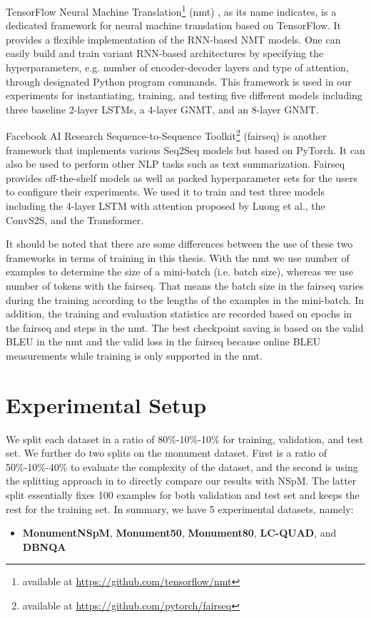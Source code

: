 TensorFlow Neural Machine Translation\footnote{available at \url{https://github.com/tensorflow/nmt}} (nmt) \cite{luong17}, as its name indicates, is a dedicated framework for neural machine translation based on TensorFlow. It provides a flexible implementation of the RNN-based NMT models. One can easily build and train variant RNN-based architectures by specifying the hyperparameters, e.g. number of encoder-decoder layers and type of attention, through designated Python program commands. This framework is used in our experiments for instantiating, training, and testing five different models including three baseline 2-layer LSTMs, a 4-layer GNMT, and an 8-layer GNMT.

Facebook AI Research Sequence-to-Sequence Toolkit\footnote{available at \url{https://github.com/pytorch/fairseq}} (fairseq) \cite{gehring2017convs2s} is another framework that implements various Seq2Seq models but based on PyTorch. It can also be used to perform other NLP tasks such as text summarization. Fairseq provides off-the-shelf models as well as packed hyperparameter sets for the users to configure their experiments. We used it to train and test three models including the 4-layer LSTM with attention proposed by Luong et al.\cite{Luong2015}, the ConvS2S, and the Transformer.

It should be noted that there are some differences between the use of these two frameworks in terms of training in this thesis. With the nmt we use number of examples to determine the size of a mini-batch (i.e. batch size), whereas we use number of tokens with the fairseq. That means the batch size in the fairseq varies during the training according to the lengths of the examples in the mini-batch. In addition, the training and evaluation statistics are recorded based on epochs in the fairseq and steps in the nmt. The best checkpoint saving is based on the valid BLEU in the nmt and the valid loss in the fairseq because online BLEU measurements while training is only supported in the nmt. 

\section{Experimental Setup} \label{section:experimental setup}

We split each dataset in a ratio of 80\%-10\%-10\% for training, validation, and test set. We further do two splits on the monument dataset. First is a ratio of 50\%-10\%-40\% to evaluate the complexity of the dataset, and the second is using the splitting approach in \cite{Soru2018a} to directly compare our results with NSpM. The latter split essentially fixes 100 examples for both validation and test set and keeps the rest for the training set. In summary, we have 5 experimental datasets, namely:
\begin{itemize}
\item \textbf{MonumentNSpM}, \textbf{Monument50}, \textbf{Monument80}, \textbf{LC-QUAD}, and \textbf{DBNQA}
\end{itemize}

